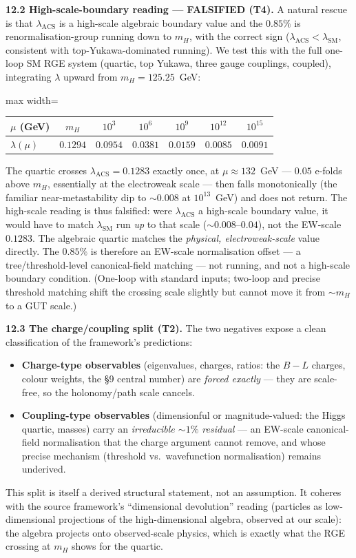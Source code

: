 \documentclass[11pt]{article}
\begin{document}
\textbf{12.2 High-scale-boundary reading --- FALSIFIED (T4).} A natural rescue is that $\lambda_{\text{ACS}}$ is a high-scale algebraic boundary value and the $0.85\%$ is renormalisation-group running down to $m_H$, with the correct sign ($\lambda_{\text{ACS}}<\lambda_{\text{SM}}$, consistent with top-Yukawa-dominated running). We test this with the full one-loop SM RGE system (quartic, top Yukawa, three gauge couplings, coupled), integrating $\lambda$ upward from $m_H=125.25$~GeV:
\begin{center}
\begin{adjustbox}{max width=\linewidth}\begin{tabular}{lcccccc}
\toprule
$\mu$ (GeV) & $m_H$ & $10^3$ & $10^6$ & $10^9$ & $10^{12}$ & $10^{15}$ \\
\midrule
$\lambda(\mu)$ & $0.1294$ & $0.0954$ & $0.0381$ & $0.0159$ & $0.0085$ & $0.0091$ \\
\bottomrule
\end{tabular}\end{adjustbox}
\end{center}
The quartic crosses $\lambda_{\text{ACS}}=0.1283$ exactly once, at $\mu\approx132$~GeV --- $0.05$ e-folds above $m_H$, essentially at the electroweak scale --- then falls monotonically (the familiar near-metastability dip to $\sim0.008$ at $10^{13}$~GeV) and does not return. The high-scale reading is thus falsified: were $\lambda_{\text{ACS}}$ a high-scale boundary value, it would have to match $\lambda_{\text{SM}}$ run \emph{up} to that scale ($\sim0.008$--$0.04$), not the EW-scale $0.1283$. The algebraic quartic matches the \emph{physical, electroweak-scale} value directly. The $0.85\%$ is therefore an EW-scale normalisation offset --- a tree/threshold-level canonical-field matching --- not running, and not a high-scale boundary condition. (One-loop with standard inputs; two-loop and precise threshold matching shift the crossing scale slightly but cannot move it from $\sim m_H$ to a GUT scale.)

\textbf{12.3 The charge/coupling split (T2).} The two negatives expose a clean classification of the framework's predictions:
\begin{itemize}[nosep]
\item \textbf{Charge-type observables} (eigenvalues, charges, ratios: the $B\!-\!L$ charges, colour weights, the \S9 central number) are \emph{forced exactly} --- they are scale-free, so the holonomy/path scale cancels.
\item \textbf{Coupling-type observables} (dimensionful or magnitude-valued: the Higgs quartic, masses) carry an \emph{irreducible $\sim1\%$ residual} --- an EW-scale canonical-field normalisation that the charge argument cannot remove, and whose precise mechanism (threshold vs.\ wavefunction normalisation) remains underived.
\end{itemize}
This split is itself a derived structural statement, not an assumption. It coheres with the source framework's ``dimensional devolution'' reading (particles as low-dimensional projections of the high-dimensional algebra, observed at our scale): the algebra projects onto observed-scale physics, which is exactly what the RGE crossing at $m_H$ shows for the quartic.
\end{document}
